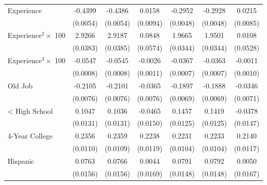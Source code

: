 {\begin{longtable}{l*{6}{c}}
Experience          &     -0.4399\sym{***}&     -0.4386\sym{***}&      0.0158\sym{*}  &     -0.2952\sym{***}&     -0.2928\sym{***}&      0.0215\sym{**} \\
                    &    (0.0054)         &    (0.0054)         &    (0.0094)         &    (0.0048)         &    (0.0048)         &    (0.0085)         \\
Experience$^2\times$ 100&      2.9266\sym{***}&      2.9187\sym{***}&      0.0848         &      1.9665\sym{***}&      1.9501\sym{***}&      0.0108         \\
                    &    (0.0383)         &    (0.0385)         &    (0.0574)         &    (0.0344)         &    (0.0344)         &    (0.0528)         \\
Experience$^3\times$ 100&     -0.0547\sym{***}&     -0.0545\sym{***}&     -0.0026\sym{**} &     -0.0367\sym{***}&     -0.0363\sym{***}&     -0.0011         \\
                    &    (0.0008)         &    (0.0008)         &    (0.0011)         &    (0.0007)         &    (0.0007)         &    (0.0010)         \\
Old Job             &     -0.2105\sym{***}&     -0.2101\sym{***}&     -0.0365\sym{***}&     -0.1897\sym{***}&     -0.1888\sym{***}&     -0.0346\sym{***}\\
                    &    (0.0076)         &    (0.0076)         &    (0.0076)         &    (0.0069)         &    (0.0069)         &    (0.0071)         \\
< High School       &      0.1047\sym{***}&      0.1036\sym{***}&     -0.0465\sym{***}&      0.1457\sym{***}&      0.1419\sym{***}&     -0.0378\sym{**} \\
                    &    (0.0131)         &    (0.0131)         &    (0.0150)         &    (0.0125)         &    (0.0125)         &    (0.0147)         \\
4-Year College      &      0.2356\sym{***}&      0.2359\sym{***}&      0.2238\sym{***}&      0.2231\sym{***}&      0.2233\sym{***}&      0.2140\sym{***}\\
                    &    (0.0110)         &    (0.0109)         &    (0.0119)         &    (0.0104)         &    (0.0104)         &    (0.0117)         \\
Hispanic            &      0.0763\sym{***}&      0.0766\sym{***}&      0.0044         &      0.0791\sym{***}&      0.0792\sym{***}&      0.0050         \\
                    &    (0.0156)         &    (0.0156)         &    (0.0169)         &    (0.0148)         &    (0.0148)         &    (0.0167)         \\

\end{longtable}}
